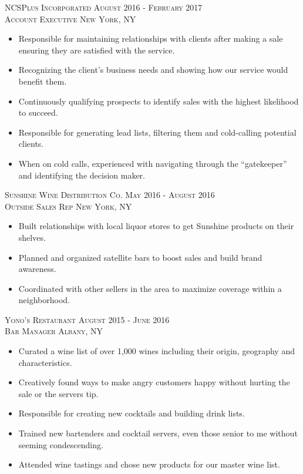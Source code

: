 \documentclass[oneside, final]{scrartcl}
\begin{document}
\begin{center}
\textsc{NCSPlus Incorporated \hfill August 2016 - February 2017 \\}
\textsc{Account Executive \hfill New York, NY\\}
\begin{itemize}
	\setlength{\itemsep}{1pt}
	\setlength{\parskip}{0pt}
	\setlength{\parsep}{0pt}
	\setlength{\leftmargin}{-5mm}
    \item Responsible for maintaining relationships with clients after making a sale ensuring they are satisfied with the service.
    \item Recognizing the client's business needs and showing how our service would benefit them. 
    \item Continuously qualifying prospects to identify sales with the highest likelihood to succeed.
    \item Responsible for generating lead lists, filtering them and cold-calling potential clients.
    \item When on cold calls, experienced with navigating through the  ``gatekeeper'' and identifying the decision maker. 
\end{itemize}


\textsc{Sunshine Wine Distribution Co. \hfill May 2016 - August 2016 \\}
\textsc{Outside Sales Rep \hfill New York, NY\\}
\begin{itemize}
	\setlength{\itemsep}{1pt}
	\setlength{\parskip}{0pt}
	\setlength{\parsep}{0pt}
	\setlength{\leftmargin}{-5mm}
    \item Built relationships with local liquor stores to get Sunshine products on their shelves.
    \item Planned and organized satellite bars to boost sales and build brand awareness.
    \item Coordinated with other sellers in the area to maximize coverage within a neighborhood.
\end{itemize}

\textsc{Yono's Restaurant \hfill August 2015 - June 2016 \\}
\textsc{Bar Manager \hfill Albany, NY\\}
\begin{itemize}
	\setlength{\itemsep}{1pt}
	\setlength{\parskip}{0pt}
	\setlength{\parsep}{0pt}
	\setlength{\leftmargin}{-5mm}
    \item Curated a wine list of over 1,000 wines including their origin, geography and characteristics.
    \item Creatively found ways to make angry customers happy without hurting the sale or the servers tip.
    \item Responsible for creating new cocktails and building drink lists.
    \item Trained new bartenders and cocktail servers, even those senior to me without seeming condescending.
    \item Attended wine tastings and chose new products for our master wine list.
\end{itemize}




\end{center}
\end{document}

